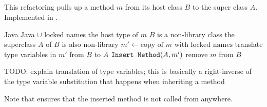 \subsection{}
This refactoring pulls up a method $m$ from its host class $B$ to the super class $A$. Implemented in .

\begin{algorithm}
\caption{$\refactoring{Pull Up Method}(m : \type{Method})$}
\begin{algorithmic}[1]
\REQUIRE Java
\ENSURE Java $\cup$ locked names
\medskip
\STATE \assert the host type of $m$ $B$ is a non-library class
\STATE \assert the superclass $A$ of $B$ is also non-library
\STATE $m' \leftarrow \text{copy of $m$ with locked names}$
\STATE translate type variables in $m'$ from $B$ to $A$
\STATE $\text{\texttt{Insert Method}}(A, m')$
\STATE remove $m$ from $B$
\end{algorithmic}
\end{algorithm}

TODO: explain translation of type variables; this is basically a right-inverse of the type variable substitution that happens when inheriting a method

Note that  ensures that the inserted method is not called from anywhere.
